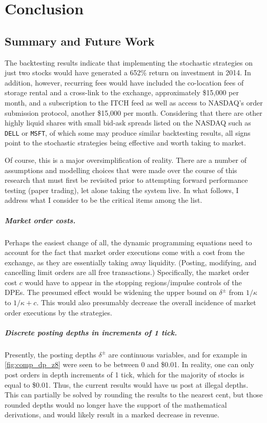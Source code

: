 \chapter{Conclusion}

\section{Summary and Future Work}
The backtesting results indicate that implementing the stochastic strategies on just two stocks would have generated a 652\% return on investment in 2014. In addition, however, recurring fees would have included the co-location fees of storage rental and a cross-link to the exchange, approximately \$15,000 per month, and a subscription to the ITCH feed as well as access to NASDAQ's order submission protocol, another \$15,000 per month. Considering that there are other highly liquid shares with small bid-ask spreads listed on the NASDAQ such as \texttt{DELL} or \texttt{MSFT}, of which some may produce similar backtesting results, all signs point to the stochastic strategies being effective and worth taking to market.

Of course, this is a major oversimplification of reality. There are a number of assumptions and modelling choices that were made over the course of this research that must first be revisited prior to attempting forward performance testing (paper trading), let alone taking the system live. In what follows, I address what I consider to be the critical items among the list.

\paragraph{Market order costs.} Perhaps the easiest change of all, the dynamic programming equations need to account for the fact that market order executions come with a cost from the exchange, as they are essentially taking away liquidity. (Posting, modifying, and cancelling limit orders are all free transactions.) Specifically, the market order cost $c$ would have to appear in the stopping regions/impulse controls of the DPEs. The presumed effect would be widening the upper bound on $\delta^\pm$ from $1/\kappa$ to $1/\kappa + c$. This would also presumably decrease the overall incidence of market order executions by the strategies.

\paragraph{Discrete posting depths in increments of 1 tick.} Presently, the posting depths $\delta^\pm$ are continuous variables, and for example in \autoref{fig:comp_dp_z8} were seen to be between 0 and \$0.01. In reality, one can only post orders in depth increments of 1 tick, which for the majority of stocks is equal to \$0.01. Thus, the current results would have us post at illegal depths. This can partially be solved by rounding the results to the nearest cent, but those rounded depths would no longer have the support of the mathematical derivations, and would likely result in a marked decrease in revenue.

